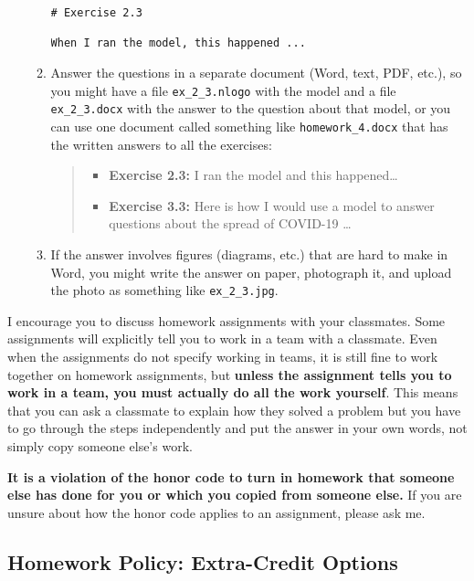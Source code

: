 \documentclass[
]{article}
\begin{document}
\begin{itemize}
\begin{enumerate}
\begin{verbatim}
# Exercise 2.3

When I ran the model, this happened ...
\end{verbatim}
  \item
    Answer the questions in a separate document (Word, text, PDF, etc.),
    so you might have a file \texttt{ex\_2\_3.nlogo} with the model and
    a file \texttt{ex\_2\_3.docx} with the answer to the question about
    that model, or you can use one document called something like
    \texttt{homework\_4.docx} that has the written answers to all the
    exercises:

    \begin{quote}
    \begin{itemize}
    \item
      \textbf{Exercise 2.3:} I ran the model and this happened\ldots{}
    \item
      \textbf{Exercise 3.3:} Here is how I would use a model to answer
      questions about the spread of COVID-19 \ldots{}
    \end{itemize}
    \end{quote}
  \item
    If the answer involves figures (diagrams, etc.) that are hard to
    make in Word, you might write the answer on paper, photograph it,
    and upload the photo as something like \texttt{ex\_2\_3.jpg}.
  \end{enumerate}
\end{itemize}

I encourage you to discuss homework assignments with your classmates.
Some assignments will explicitly tell you to work in a team with a
classmate. Even when the assignments do not specify working in teams, it
is still fine to work together on homework assignments, but
\textbf{unless the assignment tells you to work in a team, you must
actually do all the work yourself}. This means that you can ask a
classmate to explain how they solved a problem but you have to go
through the steps independently and put the answer in your own words,
not simply copy someone else's work.

\textbf{It is a violation of the honor code to turn in homework that
someone else has done for you or which you copied from someone else.} If
you are unsure about how the honor code applies to an assignment, please
ask me.

\subsection{Homework Policy: Extra-Credit
Options}\label{homework-policy-extra-credit-options}
\end{document}
